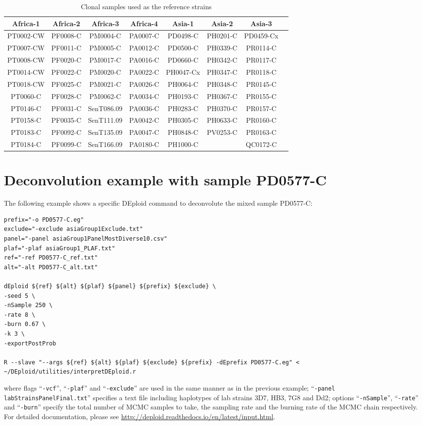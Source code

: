 \documentclass{article}
\begin{document}
\begin{table}[ht]
\centering
\begin{tabular}{|c|c|c|c|c|c|c|c|}
\hline\hline
Africa-1	&	Africa-2	&	Africa-3	&	Africa-4	&	Asia-1	&	Asia-2	&	Asia-3	\\
\hline
PT0002-CW	&	PF0008-C	&	PM0004-C	&	PA0007-C	&	PD0498-C	&	PH0201-C	&	PD0459-Cx	\\
PT0007-CW	&	PF0011-C	&	PM0005-C	&	PA0012-C	&	PD0500-C	&	PH0339-C	&	PR0114-C	\\
PT0008-CW	&	PF0020-C	&	PM0017-C	&	PA0016-C	&	PD0660-C	&	PH0342-C	&	PR0117-C	\\
PT0014-CW	&	PF0022-C	&	PM0020-C	&	PA0022-C	&	PH0047-Cx	&	PH0347-C	&	PR0118-C	\\
PT0018-CW	&	PF0025-C	&	PM0021-C	&	PA0026-C	&	PH0064-C	&	PH0348-C	&	PR0145-C	\\
PT0060-C	&	PF0028-C	&	PM0062-C	&	PA0034-C	&	PH0193-C	&	PH0367-C	&	PR0155-C	\\
PT0146-C	&	PF0031-C	&	SenT086.09	&	PA0036-C	&	PH0283-C	&	PH0370-C	&	PR0157-C	\\
PT0158-C	&	PF0035-C	&	SenT111.09	&	PA0042-C	&	PH0305-C	&	PH0633-C	&	PR0160-C	\\
PT0183-C	&	PF0092-C	&	SenT135.09	&	PA0047-C	&	PH0848-C	&	PV0253-C	&	PR0163-C	\\
PT0184-C	&	PF0099-C	&	SenT166.09	&	PA0180-C	&	PH1000-C	&		&	QC0172-C	\\
\hline\hline
\end{tabular}
\caption{Clonal samples used as the reference strains}\label{tab:panelSamples}
\end{table}


\section{Deconvolution example with sample PD0577-C}

The following example shows a specific {\textmd DEploid} command to deconvolute the mixed sample {\textmd PD0577-C}:
\linespread{1}
\begin{lstlisting}
prefix="-o PD0577-C.eg"
exclude="-exclude asiaGroup1Exclude.txt"
panel="-panel asiaGroup1PanelMostDiverse10.csv"
plaf="-plaf asiaGroup1_PLAF.txt"
ref="-ref PD0577-C_ref.txt"
alt="-alt PD0577-C_alt.txt"

dEploid ${ref} ${alt} ${plaf} ${panel} ${prefix} ${exclude} \
-seed 5 \
-nSample 250 \
-rate 8 \
-burn 0.67 \
-k 3 \
-exportPostProb

R --slave "--args ${ref} ${alt} ${plaf} ${exclude} ${prefix} -dEprefix PD0577-C.eg" < ~/DEploid/utilities/interpretDEploid.r
\end{lstlisting}
\linespread{1.5}
where flags ``{\tt -vcf}'', ``{\tt -plaf}'' and ``{\tt -exclude}'' are used in the same manner as in the previous example; ``{\tt -panel labStrainsPanelFinal.txt}'' specifies a text file including haplotypes of lab strains 3D7, HB3, 7G8 and Dd2; options ``{\tt -nSample}'', ``{\tt -rate}'' and ``{\tt -burn}'' specify the total number of MCMC samples to take, the sampling rate and the burning rate of the MCMC chain respectively. For detailed documentation, please see \url{http://deploid.readthedocs.io/en/latest/input.html}.
\end{document}
